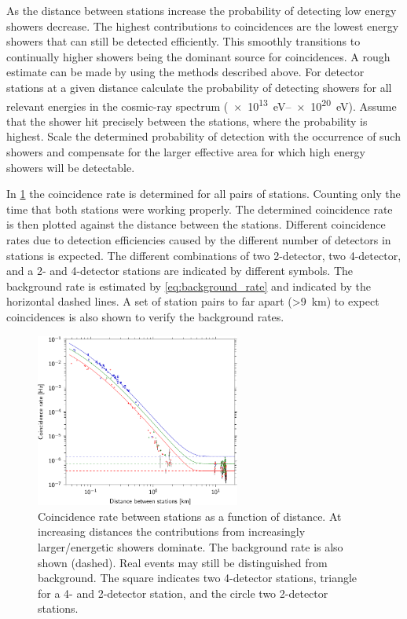 As the distance between stations increase the probability of detecting low energy showers decrease. The highest contributions to coincidences are the lowest energy showers that can still be detected efficiently. This smoothly transitions to continually higher showers being the dominant source for coincidences. A rough estimate can be made by using the methods described above. For detector stations at a given distance calculate the probability of detecting showers for all relevant energies in the cosmic-ray spectrum (\SIrange{e13}{e20}{\eV}). Assume that the shower hit precisely between the stations, where the probability is highest. Scale the determined probability of detection with the occurrence of such showers and compensate for the larger effective area for which high energy showers will be detectable.

In \cref{fig:distance_v_coincidence_rate} the coincidence rate is determined for all pairs of stations. Counting only the time that both stations were working properly. The determined coincidence rate is then plotted against the distance between the stations. Different coincidence rates due to detection efficiencies caused by the different number of detectors in stations is expected. The different combinations of two 2-detector, two 4-detector, and a 2- and 4-detector stations are indicated by different symbols. The background rate is estimated by \cref{eq:background_rate} and indicated by the horizontal dashed lines. A set of station pairs to far apart (\SI{>9}{\kilo\meter}) to expect coincidences is also shown to verify the background rates.

\begin{figure}
    \centering
    \includegraphics[width=0.6\textwidth]
                    {plots/cluster/distance_v_coincidence_rate}
    \caption{Coincidence rate between stations as a function of distance. At increasing distances the contributions from increasingly larger/energetic showers dominate. The background rate is also shown (dashed). Real events may still be distinguished from background. The square indicates two 4-detector stations, triangle for a 4- and 2-detector station, and the circle two 2-detector stations.}
    \label{fig:distance_v_coincidence_rate}
\end{figure}


